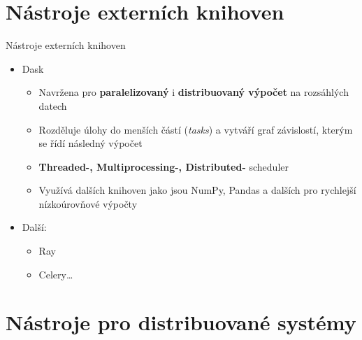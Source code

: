 \documentclass{beamer}
\begin{document}
\section{Nástroje externích knihoven}
\begin{frame}{Nástroje externích knihoven}
	\begin{itemize}
    \item Dask
      \begin{itemize}
        \item [\textendash] Navržena pro \textbf{paralelizovaný} i \textbf{distribuovaný výpočet} na rozsáhlých datech

        \item [\textendash] Rozděluje úlohy do menších částí (\textit{tasks}) a vytváří graf závislostí, kterým se řídí následný výpočet

        \item [\textendash] \textbf{Threaded-, Multiprocessing-, Distributed-} scheduler

        \item [\textendash] Využívá dalších knihoven jako jsou NumPy, Pandas a dalších pro rychlejší nízkoúrovňové výpočty
      \end{itemize}
    \item Další:
      \begin{itemize}
        \item [\textendash] Ray
        \item [\textendash] Celery\dots
      \end{itemize}
  \end{itemize}
\end{frame}


\section{Nástroje pro distribuované systémy}
\end{document}
